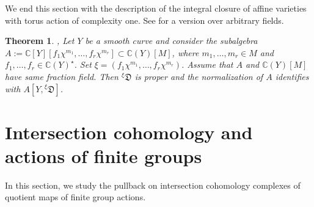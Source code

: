 \documentclass[11pt, reqno]{amsart}
\theoremstyle{plain}
\newtheorem{theorem}{Theorem}[section]
\theoremstyle{definition}
\theoremstyle{remark}
\begin{document}
We end this section with the description of the integral closure of affine varieties with torus action of complexity one. 
See \cite{Lan15} for a version over arbitrary fields. 
\begin{theorem}\label{theo-norma}\cite[Proposition 3.9]{FZ03},  \cite[Th\'eor\`eme 2.4]{Lan13}
Let $Y$ be a smooth curve and consider the subalgebra $A:= \mathbb{C}[Y][f_{1}\chi^{m_{1}}, \ldots, f_{r}\chi^{m_{r}}]\subset \mathbb{C}(Y)[M]$, where $m_{1}, \ldots, m_{r}\in M$ and $f_{1}, \ldots, f_{r}\in \mathbb{C}(Y)^{\star}$. Set $\xi =  (f_{1}\chi^{m_{1}}, \ldots, f_{r}\chi^{m_{r}})$. Assume that $A$ and $\mathbb{C}(Y)[M]$ have same fraction field. Then ${}^{\xi}\mathfrak{D}$ is proper and the normalization of $A$ identifies with $A[Y, {}^{\xi}\mathfrak{D}]$.

\end{theorem}
\section{Intersection cohomology and actions of finite groups}\label{sec-three}
In this section, we study the pullback on intersection cohomology complexes of quotient maps of finite group actions.
\end{document}
